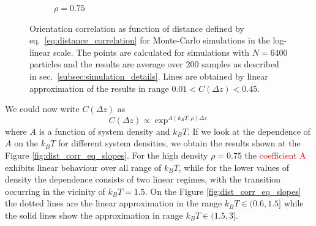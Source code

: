 \begin{figure}[h]
\begin{subfigure}[t]{0.32\textwidth}
	\caption{$\rho = 0.75$}
\end{subfigure}
	\captionsetup{justification=centering, width=0.9\columnwidth}
	\caption{Orientation correlation as function of distance defined by eq.~\eqref{eq:distance_correlation} for Monte-Carlo simulations in the log-linear scale. The points are calculated for simulations with $N = 6400$ particles and the results are average over $200$ samples as described in sec.~\ref{subsec:simulation_details}. Lines are obtained by linear approximation of the results in range $0.01 < C(\Delta z) < 0.45$.}
	\label{fig:dist_corr_eq}
\end{figure}

We could now write $C(\Delta z)$ as
\begin{equation}
	\label{eq:slopes_def}
	C(\Delta z) \propto \exp^{A(k_BT, \rho) \Delta z}
\end{equation}
where $A$ is a function of system density and $k_BT$. If we look at the dependence of $A$ on the $k_BT$ for different system densities, we obtain the results shown at the Figure \ref{fig:dist_corr_eq_slopes}. For the high density $\rho = 0.75$ the \textcolor{red}{coefficient A} exhibits linear behaviour over all range of $k_BT$, while for the lower values of density the dependence consists of two linear regimes, with the transition occurring in the vicinity of $k_BT = 1.5$. On the Figure \ref{fig:dist_corr_eq_slopes} the dotted lines are the linear approximation in the range $k_BT \in (0.6, 1.5]$ while the solid lines show the approximation in range $k_BT \in (1.5, 3]$.

